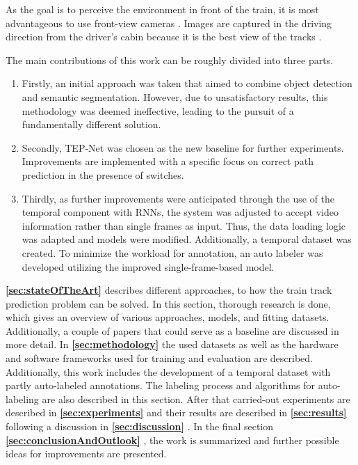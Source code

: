 As the goal is to perceive the environment in front of the train, it is most advantageous to use front-view cameras \cite{tepNet2024} \cite{railNet2019}.
Images are captured in the driving direction from the driver's cabin because it is the best view of the tracks \cite{tepNet2024}.

The main contributions of this work can be roughly divided into three parts.

\begin{enumerate}
    \item Firstly, an initial approach was taken that aimed to combine object detection and semantic segmentation.
    However, due to unsatisfactory results, this methodology was deemed ineffective, leading to the pursuit of a fundamentally different solution.
    \item Secondly, \ac{TEP}-Net \cite{tepNet2024} was chosen as the new baseline for further experiments.
    Improvements are implemented with a specific focus on correct path prediction in the presence of switches.
    \item Thirdly, as further improvements were anticipated through the use of the temporal component with \ac{RNN}s, the system was adjusted to accept video information rather than single frames as input.
    Thus, the data loading logic was adapted and models were modified.
    Additionally, a temporal dataset was created.
    To minimize the workload for annotation, an auto labeler was developed utilizing the improved single-frame-based model.
\end{enumerate}

\vspace{2cm} %

\textbf{\ref{sec:stateOfTheArt}} \textbf{} describes different approaches, to how the train track prediction problem can be solved.
In this section, thorough research is done, which gives an overview of various approaches, models, and fitting datasets.
Additionally, a couple of papers that could serve as a baseline are discussed in more detail.
In \textbf{\ref{sec:methodology}} \textbf{} the used datasets as well as the hardware and software frameworks used for training and evaluation are described.
Additionally, this work includes the development of a temporal dataset with partly auto-labeled annotations.
The labeling process and algorithms for auto-labeling are also described in this section.
After that carried-out experiments are described in \textbf{\ref{sec:experiments}} \textbf{} and their results are described in \textbf{\ref{sec:results}} \textbf{} following a discussion in \textbf{\ref{sec:discussion}} \textbf{}.
In the final section \textbf{\ref{sec:conclusionAndOutlook}} \textbf{}, the work is summarized and further possible ideas for improvements are presented.
